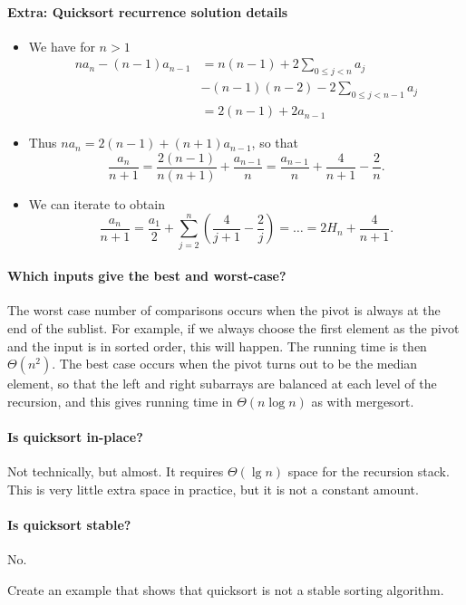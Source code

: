 \paragraph{Extra: Quicksort recurrence solution details}
\begin{itemize}
\item  We have for $n>1$
\begin{align*}
na_n - (n-1) a_{n-1} & = n(n-1) + 2 \sum_{0\leq j < n} a_j \\
& - (n-1)(n-2) - 2\sum_{0 \leq j < n - 1} a_j \\
& = 2(n - 1) + 2 a_{n-1}
\end{align*}
\item
Thus $na_n = 2(n - 1) + (n+1)a_{n-1}$, so that 
$$
\frac{a_n}{n+1} = \frac{2(n-1)}{n(n+1)} + \frac{a_{n-1}}{n} = 
\frac{a_{n-1}}{n} + \frac{4}{n+1} - \frac{2}{n}.
$$
\item
We can iterate to obtain
$$\frac{a_n}{n+1} = \frac{a_1}{2} + \sum_{j=2}^n \left(\frac{4}{j+1} - 
\frac{2}{j}\right) = \dots = 2H_n + \frac{4}{n+1}.$$
\end{itemize}


\paragraph{Which inputs give the best and worst-case?}
The worst case number of comparisons occurs when the pivot is always at the end of the sublist. For example, if we always choose the first element as the pivot and the input is in sorted order, this will happen. The running time is then $\Theta(n^2)$. The best case occurs when the pivot turns out to be the median element, so that the left and right subarrays are balanced at each level of the recursion, and this gives running time in $\Theta(n\log n)$ as with mergesort.

\paragraph{Is quicksort in-place?}
Not technically, but almost. It requires $\Theta(\lg n)$ space for the recursion stack. This is very little extra space in practice, but it is not a constant amount.


\paragraph{Is quicksort stable?}
No.
\begin{Boxample}[5]
Create an example that shows that quicksort is not a stable sorting algorithm.

\end{Boxample}



